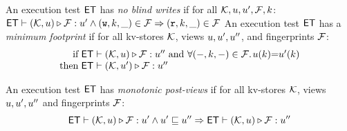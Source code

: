 \begin{definition}[$\ET$ properties]
\label{def:et_properties}
An execution test $\ET$ has \emph{no blind writes} if
for all $\mathcal{K}, u, u', \mathcal{F}, k$:\\
\indent
$
\mathsf{ET} \vdash (\mathcal{K}, u) \triangleright \mathcal{F}: u' 
\land (\textnormal{\texttt w}, k, \_) \in \mathcal{F}
\Rightarrow (\textnormal{\texttt r}, k, \_) \in \mathcal{F}
$
An execution test $\ET$ has a \emph{minimum footprint} if for all kv-stores $\mathcal{K}$,
views $u, u',u''$, and fingerprints $\mathcal{F}$: 
%
\[
\begin{array}{@{} r @{\hspace{3pt}} l @{}}
\text{if} & \ET \vdash (\hh, \vi) \triangleright \opset : \vi'' 
\text{ and } \fora{(\stub, \ke, \stub) \in \f}\!\! \vi(\ke) {=} \vi'(\ke) \\
\text{then} & \ET \vdash (\hh, \vi') \triangleright \opset : \vi''
\end{array} 
\]
%

An execution test $\ET$ has \emph{monotonic post-views} if 
for all kv-stores $\mathcal{K}$, 
views $u, u',u''$ and fingerprints $\mathcal{F}$:
\[
    \mathsf{ET} \vdash (\mathcal{K}, u) \triangleright \mathcal{F} : u' 
    \land u' \sqsubseteq u'' 
    \Rightarrow 
    \mathsf{ET} \vdash (\mathcal{K}, u) \triangleright \mathcal{F} : u''
\]
\end{definition}
